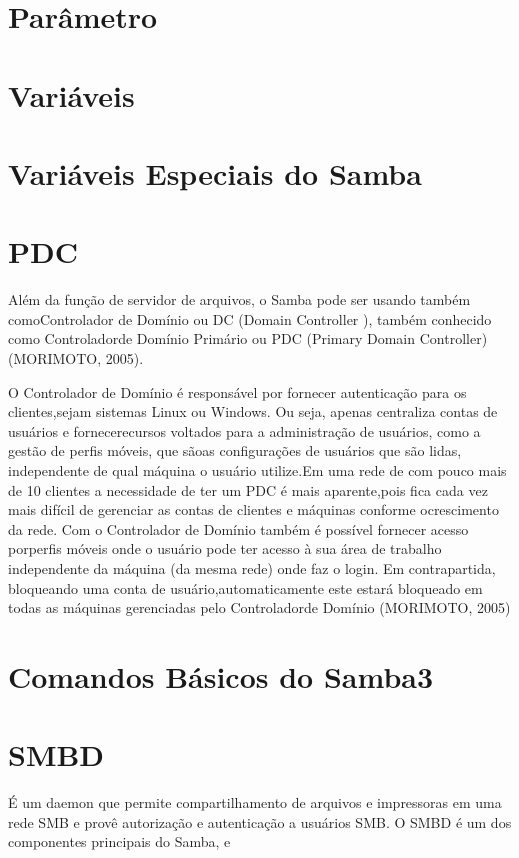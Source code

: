 \section{Parâmetro}

\section{Variáveis}

\section{Variáveis Especiais do Samba}

\section{PDC}

Além da função de servidor de arquivos, o Samba pode ser usando também comoControlador de Domínio ou DC (Domain Controller 
), também conhecido como Controladorde Domínio Primário ou PDC (Primary Domain Controller) (MORIMOTO, 2005).

O Controlador de Domínio é responsável por fornecer autenticação para os clientes,sejam sistemas Linux ou Windows. Ou seja, apenas centraliza contas de usuários e fornecerecursos voltados para a administração de usuários, como a gestão de perfis móveis, que sãoas configurações de usuários que são lidas, independente de qual máquina o usuário utilize.Em uma rede de com pouco mais de 10 clientes a necessidade de ter um PDC é mais aparente,pois fica cada vez mais difícil de gerenciar as contas de clientes e máquinas conforme ocrescimento da rede. Com o Controlador de Domínio também é possível fornecer acesso porperfis móveis onde o usuário pode ter acesso à sua área de trabalho independente da máquina (da mesma rede) onde faz o login. Em contrapartida, bloqueando uma conta de usuário,automaticamente este estará bloqueado em todas as máquinas gerenciadas pelo Controladorde Domínio (MORIMOTO, 2005)

\section{Comandos Básicos do Samba3}

\section{SMBD}

É um daemon que permite compartilhamento de arquivos e impressoras em uma rede SMB e provê autorização e autenticação a usuários SMB. O SMBD é um dos componentes principais do Samba, e 

